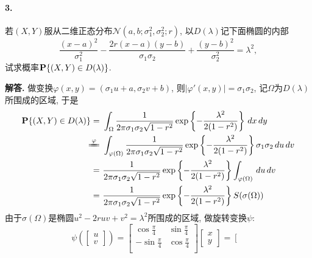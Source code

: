 \documentclass[12pt, a4paper, oneside]{ctexart}
\newenvironment{solution}{\par\noindent\textbf{解答. }}{\bigskip\par}
\begin{document}
\paragraph{3.}若$(X,Y)$服从二维正态分布$\mathcal{N}(a, b;\sigma_1^2,\sigma_2^2; r)$, 以$D(\lambda)$记下面椭圆的内部
\begin{equation*}
    \frac{(x-a)^2}{\sigma_1^2}-\frac{2r(x-a)(y-b)}{\sigma_1\sigma_2}+\frac{(y-b)^2}{\sigma_2^2} = \lambda^2,
\end{equation*}
试求概率$\P\{(X,Y)\in D(\lambda)\}$.
\begin{solution}
    做变换$\varphi(x, y) = (\sigma_1 u + a, \sigma_2 v + b)$, 则$|\varphi'(x, y)| = \sigma_1\sigma_2$, 记$\Omega$为$D(\lambda)$所围成的区域, 于是
    \begin{equation*}
        \begin{aligned}
            \P\{(X, Y)\in D(\lambda)\} =&\ \int_{\Omega}\frac{1}{2\pi\sigma_1\sigma_2\sqrt{1-r^2}}\exp\left\{-\frac{\lambda^2}{2(1-r^2)}\right\}\,dx\,dy\\
            \xlongequal{\varphi}&\ \int_{\varphi(\Omega)}\frac{1}{2\pi\sigma_1\sigma_2\sqrt{1-r^2}}\exp\left\{-\frac{\lambda^2}{2(1-r^2)}\right\}\sigma_1\sigma_2\,du\,dv\\
            =&\ \frac{1}{2\pi\sigma_1\sigma_2\sqrt{1-r^2}}\exp\left\{-\frac{\lambda^2}{2(1-r^2)}\right\}\int_{\varphi(\Omega)}\,du\,dv\\
            =&\ \frac{1}{2\pi\sigma_1\sigma_2\sqrt{1-r^2}}\exp\left\{-\frac{\lambda^2}{2(1-r^2)}\right\}S(\sigma(\Omega))\\
        \end{aligned}
    \end{equation*}
    由于$\sigma(\Omega)$是椭圆$u^2-2ruv+v^2 = \lambda^2$所围成的区域, 做旋转变换$\psi$:
    \begin{equation*}
        \psi\left(\left[\begin{matrix}
            u\\v
        \end{matrix}\right]\right) = \left[\begin{matrix}
            \cos\frac{\pi}{4}&\sin\frac{\pi}{4}\\
            -\sin\frac{\pi}{4}&\cos\frac{\pi}{4}\\
        \end{matrix}\right]\left[\begin{matrix}
            x\\y
        \end{matrix}\right] = \left[\begin{matrix}

\end{matrix}
\end{equation*}
\end{solution}
\end{document}
